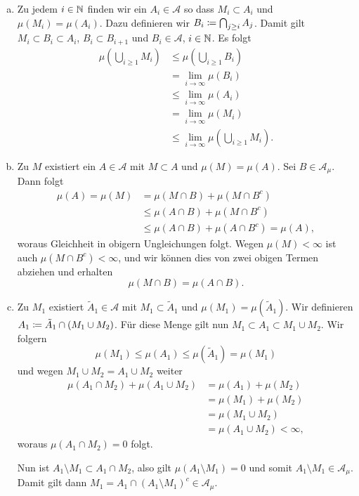 \documentclass[a4paper,twoside,DIV15,BCOR12mm]{scrbook}
\newcommand{\A}{\mathcal A}
\begin{document}
\begin{beweis}

\begin{enumerate}[a)]
\item Zu jedem $i\in\mathbb{N}$ finden wir ein $A_i\in \A$ so dass $M_i\subset A_i$ und $\mu(M_i) =\mu(A_i)$. Dazu definieren wir $B_i \da \bigcap_{j\ge i} A_j$. Damit gilt $M_i \subset B_i\subset A_i$, $B_i\subset B_{i+1}$ und $B_i\in\A$, $i\in\mathbb{N}$. Es folgt
\begin{align*}
\mu(\bigcup_{i\ge 1} M_i) &\le \mu(\bigcup_{i\ge1}B_i) \\
&= \lim_{i\to\infty} \mu(B_i) \\
&\le \lim_{i\to\infty} \mu(A_i) \\
&= \lim_{i\to\infty} \mu(M_i) \\
&\le \lim_{i\to\infty} \mu(\bigcup_{i\ge 1} M_i).
\end{align*}
\item  Zu $M$ existiert ein $A\in\A$ mit $M\subset A$ und $\mu(M) = \mu(A)$. Sei $B\in \A_\mu$. Dann folgt
\begin{align*}
\mu(A) = \mu(M) &= \mu(M\cap B) + \mu(M\cap B^c) \\
&\le \mu(A\cap B) + \mu(M \cap B^c) \\
&\le \mu(A\cap B) + \mu(A \cap B^c) = \mu(A),
\end{align*}
woraus Gleichheit in obigern Ungleichungen folgt. Wegen $\mu(M)<\infty$ ist auch $\mu(M\cap B^c)<\infty$, und wir können dies von zwei obigen Termen abziehen und erhalten
\[
\mu(M\cap B) = \mu(A\cap B).
\]
\item  Zu $M_1$ existiert $\tilde A_1\in\A$ mit $M_1 \subset \tilde A_1$ und $\mu(M_1) = \mu(\tilde A_1)$. Wir definieren $A_1 \da \tilde A_1 \cap (M_1\cup M_2)$. Für diese Menge gilt nun $M_1\subset A_1 \subset M_1\cup M_2$. Wir folgern 
\[
\mu(M_1) \le \mu(A_1) \le \mu (\tilde A_1) = \mu(M_1)
\]
und wegen $M_1\cup M_2 = A_1\cup M_2$ weiter
\begin{align*}
\mu(A_1\cap M_2) + \mu(A_1 \cup M_2) &= \mu(A_1) + \mu(M_2) \\
&= \mu(M_1) + \mu(M_2) \\
&= \mu(M_1\cup M_2) \\
&= \mu(A_1 \cup M_2) < \infty,
\end{align*}
woraus $\mu(A_1\cap M_2) = 0$ folgt.

Nun ist $A_1\setminus M_1\subset A_1\cap M_2$, also gilt $\mu(A_1\setminus M_1) = 0$ und somit $A_1\setminus M_1\in \A_\mu$. Damit gilt dann $M_1 = A_1\cap (A_1\setminus M_1)^c\in \A_\mu$.
\end{enumerate}

\end{beweis}
\end{document}
